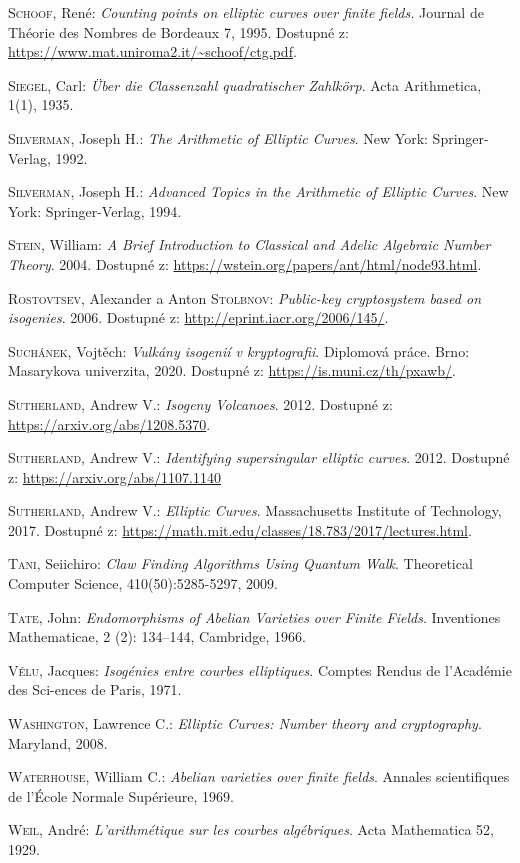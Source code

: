 \documentclass[12pt]{report}
\begin{document}
\begin{thebibliography}{97}
\textsc{Schoof}, René: \textit{Counting points on elliptic curves over finite fields.} Journal de Théorie des Nombres de Bordeaux 7, 1995. Dostupné z: \url{https://www.mat.uniroma2.it/~schoof/ctg.pdf}.

\textsc{Siegel}, Carl: \textit{Über die Classenzahl quadratischer Zahlkörp}. Acta Arithmetica, 1(1), 1935.

\textsc{Silverman}, Joseph H.: \textit{The Arithmetic of Elliptic Curves}. New York: Springer-Verlag, 1992. 

\textsc{Silverman}, Joseph H.: \textit{Advanced Topics in the Arithmetic of Elliptic Curves}. New York: Springer-Verlag, 1994. 


\textsc{Stein}, William: \textit{A Brief Introduction to Classical and Adelic Algebraic Number Theory}. 2004. Dostupné z: \url{https://wstein.org/papers/ant/html/node93.html}.

\textsc{Rostovtsev}, Alexander a Anton \textsc{Stolbnov}:\textit{ Public-key cryptosystem based on isogenies}. 2006. Dostupné z: \url{http://eprint.iacr.org/2006/145/}. 


\textsc{Suchánek}, Vojtěch: \textit{Vulkány isogenií v kryptografii}. Diplomová práce. Brno: Masarykova univerzita, 2020. Dostupné z: \url{https://is.muni.cz/th/pxawb/}.

\textsc{Sutherland}, Andrew V.: \textit{Isogeny Volcanoes}. 2012. Dostupné z: \url{https://arxiv.org/abs/1208.5370}.

\textsc{Sutherland}, Andrew V.: \textit{Identifying supersingular elliptic curves}. 2012. Dostupné z: \url{https://arxiv.org/abs/1107.1140}

\textsc{Sutherland}, Andrew V.: \textit{Elliptic Curves}. Massachusetts Institute of Technology, 2017. Dostupné z: \url{https://math.mit.edu/classes/18.783/2017/lectures.html}. 

\textsc{Tani}, Seiichiro: \textit{Claw Finding Algorithms Using Quantum Walk}. Theoretical Computer Science, 410(50):5285-5297, 2009.

\textsc{Tate}, John: \textit{Endomorphisms of Abelian Varieties over Finite Fields}. Inventiones Mathematicae, 2 (2): 134–144, Cambridge, 1966.

\textsc{Vélu}, Jacques: \textit{Isogénies entre courbes elliptiques}. Comptes Rendus de l’Académie des Sci-ences de Paris, 1971. 

\textsc{Washington}, Lawrence C.: \textit{Elliptic Curves: Number theory and cryptography}. Maryland, 2008. 

\textsc{Waterhouse}, William C.: \textit{Abelian varieties over finite fields}. Annales scientifiques de l’École Normale Supérieure, 1969.

\textsc{Weil}, André: \textit{L'arithmétique sur les courbes algébriques}.  Acta Mathematica 52, 1929. 


\end{thebibliography}
\end{document}
